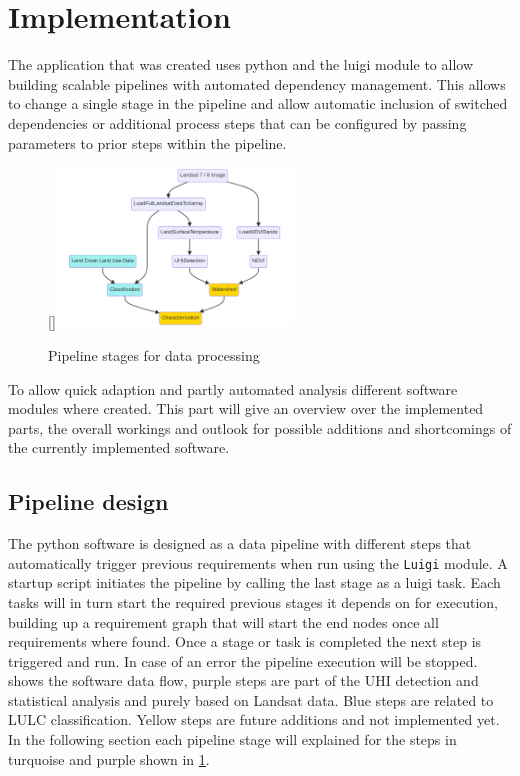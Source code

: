 \documentclass[a4paper, english]{article}
\begin{document}
\section{Implementation}
The application that was created uses python and the luigi module to allow building scalable pipelines with automated dependency management. 
This allows to change a single stage in the pipeline %
and allow automatic inclusion of switched dependencies or additional process steps that can be configured by passing parameters to prior steps within the pipeline. 
\begin{figure}
    \centering
    \raisebox{0pt}[\dimexpr{}\baselineskip\relax]{\includegraphics[width=0.56\textwidth]{img/DiagPipeline}}
    \caption{Pipeline stages for data processing\label{fig:pipeline}}
    \vspace{-2em}
\end{figure}
To allow quick adaption and partly automated analysis different software modules where created. 
This part will give an overview over the implemented parts, the overall workings and outlook for possible additions and shortcomings of the currently implemented software. 
\subsection{Pipeline design}
The python software is designed as a data pipeline with different steps that automatically trigger previous requirements when run using the \texttt{Luigi} module\cite{swLuigi}.
A startup script initiates the pipeline by calling the last stage as a luigi task. Each tasks will in turn start the required previous stages it depends on for execution, building up a requirement graph that will start the end nodes once all requirements where found. 
Once a stage or task is completed the next step is triggered and run. 
In case of an error the pipeline execution will be stopped.
 shows the software data flow, purple steps are part of the \ac{UHI} detection and statistical analysis and purely based on Landsat data. Blue steps are related to \ac{LULC} classification.
Yellow steps are future additions and not implemented yet. 
In the following section each pipeline stage will explained for the steps in turquoise and purple shown in \cref{fig:pipeline}.
\end{document}
